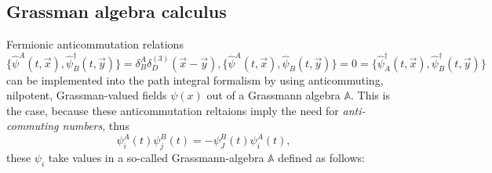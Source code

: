 \subsection{Grassman algebra calculus}
Fermionic anticommutation relations $\{\hat{\psi}^A(t,\vec{x}), \hat{\psi}^{\dagger}_B(t,\vec{y})  \} = \delta^A_B \delta^{(3)}_D(\vec{x}-\vec{y}), \{\hat{\psi}^A(t,\vec{x}), \hat{\psi}_B(t,\vec{y}) \}=0=\{\hat{\psi}^{\dagger}_A(t,\vec{x}), \hat{\psi}^{\dagger}_B(t,\vec{y})  \}$ can be implemented into the path integral formalism by using anticommuting, nilpotent, Grassman-valued fields $\psi(x)$ out of a Grassmann algebra $\mathbb{A}$. This is the case, because these anticommutation reltaions imply the need for \emph{anti-commuting numbers}, thus
\begin{equation}
	\psi^A_i(t)\psi^B_j(t) = - \psi^B_J(t) \psi^A_i(t),
\end{equation}
these $\psi_i$ take values in a so-called Grassmann-algebra $\mathbb{A}$ defined as follows:
